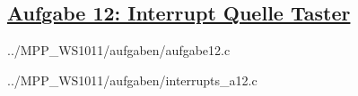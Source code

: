 \subsection*
{\href{http://cst.mi.fu-berlin.de/intern/19606-P-MPP/Aufgaben/040401.html}
{Aufgabe 12: Interrupt Quelle Taster}}


{../MPP_WS1011/aufgaben/aufgabe12.c}


{../MPP_WS1011/aufgaben/interrupts_a12.c}
